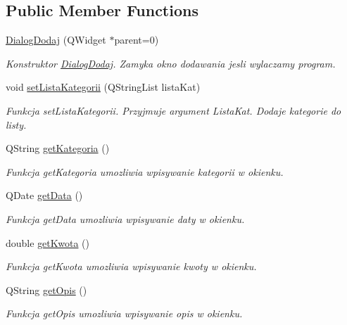 \subsection*{Public Member Functions}
\begin{DoxyCompactItemize}
\item 
\hyperlink{class_dialog_dodaj_ad0b34b49b64f5a80112be0ad90af8f79}{Dialog\+Dodaj} (Q\+Widget $\ast$parent=0)
\begin{DoxyCompactList}\small\item\em Konstruktor \hyperlink{class_dialog_dodaj}{Dialog\+Dodaj}. Zamyka okno dodawania jesli wylaczamy program. \end{DoxyCompactList}\item 
void \hyperlink{class_dialog_dodaj_a8c6c561a5a1427422ed8e6c3be794aaf}{set\+Lista\+Kategorii} (Q\+String\+List lista\+Kat)
\begin{DoxyCompactList}\small\item\em Funkcja set\+Lista\+Kategorii. Przyjmuje argument Lista\+Kat. Dodaje kategorie do listy. \end{DoxyCompactList}\item 
Q\+String \hyperlink{class_dialog_dodaj_a730c587aec50f9a1fa092597ade172df}{get\+Kategoria} ()
\begin{DoxyCompactList}\small\item\em Funkcja get\+Kategoria umozliwia wpisywanie kategorii w okienku. \end{DoxyCompactList}\item 
Q\+Date \hyperlink{class_dialog_dodaj_ad7e955de6adf2bd0dfe001c6973010d3}{get\+Data} ()
\begin{DoxyCompactList}\small\item\em Funkcja get\+Data umozliwia wpisywanie daty w okienku. \end{DoxyCompactList}\item 
double \hyperlink{class_dialog_dodaj_a105359d1ef27ae66ec5e0ed6d7272e37}{get\+Kwota} ()
\begin{DoxyCompactList}\small\item\em Funkcja get\+Kwota umozliwia wpisywanie kwoty w okienku. \end{DoxyCompactList}\item 
Q\+String \hyperlink{class_dialog_dodaj_ab3738341a33051b2d817400c2d7239a3}{get\+Opis} ()
\begin{DoxyCompactList}\small\item\em Funkcja get\+Opis umozliwia wpisywanie opis w okienku. \end{DoxyCompactList}\item 

\end{DoxyCompactItemize}
